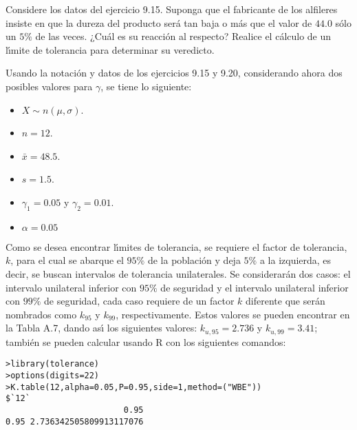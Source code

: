 \begin{enunciado}
 Considere los datos del ejercicio 9.15. Suponga que el fabricante de los alfileres insiste en que la dureza del producto ser\'a tan baja o m\'as que el valor de $44.0$ s\'olo un $5\%$ de las veces. ¿Cu\'al es su reacci\'on al respecto? Realice el c\'alculo de un l\'{\i}mite de tolerancia para determinar su veredicto.
\end{enunciado}

\begin{solucion}
 Usando la notaci\'on y datos de los ejercicios 9.15 y 9.20, considerando ahora dos posibles valores para $\gamma$, se tiene lo siguiente:
 \begin{itemize}
  \item $X\sim n(\mu, \sigma)$.
  \item $n=12$.
  \item $\bar{x} = 48.5$.
  \item $s = 1.5$.
  \item $\gamma_1 = 0.05$ y $\gamma_2 = 0.01$.
  \item $\alpha=0.05$
 \end{itemize}
 Como se desea encontrar l\'{\i}mites de tolerancia, se requiere el factor de tolerancia, $k$, para el cual se abarque el $95\%$ de la poblaci\'on y deja $5\%$ a la izquierda, es decir, se buscan intervalos de tolerancia unilaterales. Se considerar\'an dos casos: el intervalo unilateral inferior con $95\%$ de seguridad y el intervalo unilateral inferior con $99\%$ de seguridad, cada caso requiere de un factor $k$ diferente que ser\'an nombrados como $k_{95}$ y $k_{99}$, respectivamente. Estos valores se pueden encontrar en la Tabla A.7, dando as\'{\i} los siguientes valores: $k_{u,95} = 2.736$ y $k_{u,99} = 3.41$; tambi\'en se pueden calcular usando R con los siguientes comandos:
 \begin{verbatim}
>library(tolerance)
>options(digits=22)
>K.table(12,alpha=0.05,P=0.95,side=1,method=("WBE"))
$`12`
                        0.95
0.95 2.736342505809913117076


\end{verbatim}
\end{solucion}
